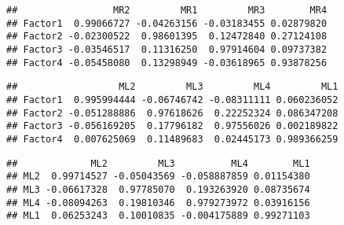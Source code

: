\documentclass[
]{article}
\newenvironment{Shaded}{\begin{snugshade}}{\end{snugshade}}
\newcommand{\DataTypeTok}[1]{\textcolor[rgb]{0.13,0.29,0.53}{#1}}
\newcommand{\DecValTok}[1]{\textcolor[rgb]{0.00,0.00,0.81}{#1}}
\newcommand{\KeywordTok}[1]{\textcolor[rgb]{0.13,0.29,0.53}{\textbf{#1}}}
\newcommand{\NormalTok}[1]{#1}
\newcommand{\OperatorTok}[1]{\textcolor[rgb]{0.81,0.36,0.00}{\textbf{#1}}}
\newcommand{\StringTok}[1]{\textcolor[rgb]{0.31,0.60,0.02}{#1}}
\begin{document}
\begin{Shaded}
\end{Shaded}

\begin{verbatim}
##                 MR2         MR1         MR3        MR4
## Factor1  0.99066727 -0.04263156 -0.03183455 0.02879820
## Factor2 -0.02300522  0.98601395  0.12472840 0.27124108
## Factor3 -0.03546517  0.11316250  0.97914604 0.09737382
## Factor4 -0.05458080  0.13298949 -0.03618965 0.93878256
\end{verbatim}

\begin{Shaded}
\end{Shaded}

\begin{verbatim}
##                  ML2         ML3         ML4         ML1
## Factor1  0.995994444 -0.06746742 -0.08311111 0.060236052
## Factor2 -0.051288886  0.97618626  0.22252324 0.086347208
## Factor3 -0.056169205  0.17796182  0.97556026 0.002189822
## Factor4  0.007625069  0.11489683  0.02445173 0.989366259
\end{verbatim}

\begin{Shaded}
\end{Shaded}

\begin{verbatim}
##             ML2         ML3          ML4        ML1
## ML2  0.99714527 -0.05043569 -0.058887859 0.01154380
## ML3 -0.06617328  0.97785070  0.193263920 0.08735674
## ML4 -0.08094263  0.19810346  0.979273972 0.03916156
## ML1  0.06253243  0.10010835 -0.004175889 0.99271103
\end{verbatim}

\begin{Shaded}
\end{Shaded}
\end{document}
